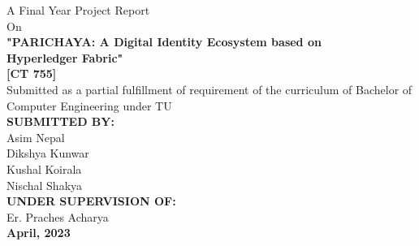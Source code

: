 
{
    \thispagestyle{empty}
    \centering

   \fontsize{14pt}{14pt}\selectfont
        {A Final Year Project Report}\\ 
        {On}\\[1.5cm]

        
            \textbf{"\MakeUppercase{Parichaya}: A Digital Identity Ecosystem based on \\ Hyperledger Fabric"}\\
            \textbf{[CT 755]}\\[2cm]
    {Submitted as a partial fulfillment of requirement of the curriculum of Bachelor of Computer Engineering under TU}\\[3cm]
    \textbf{\MakeUppercase{Submitted By:}}\\
    {Asim Nepal}\\
    {Dikshya Kunwar}\\
    {Kushal Koirala}\\
    {Nischal Shakya}\\[2.5cm]
    
    \textbf{\MakeUppercase{Under Supervision Of:}}\\
    {Er. Praches Acharya}\\[2.5cm]
    
        \textbf{April, 2023}\\
}
